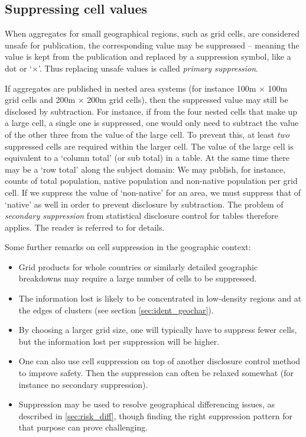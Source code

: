 \subsection{Suppressing cell values} \label{sec:aux_suppr}

When aggregates for small geographical regions, such as grid cells, are considered unsafe for publication, the corresponding value may be suppressed -- meaning the value is kept from the publication and replaced by a suppression symbol, like a dot or `$\times$'. Thus replacing unsafe values is called \emph{primary suppression}. 

If aggregates are published in nested area systems (for instance 100m $\times$ 100m grid cells and 200m $\times$ 200m grid cells), then the suppressed value may still be disclosed by subtraction. For instance, if from the four nested cells that make up a large cell, a single one is suppressed, one would only need to subtract the value of the other three from the value of the large cell. To prevent this, at least \emph{two} suppressed cells are required within the larger cell. The value of the large cell is equivalent to a `column total' (or sub total) in a table. At the same time there may be a `row total' along the subject domain: We may publish, for instance, counts of total population, native population and non-native population per grid cell. If we suppress the value of `non-native' for an area, we must suppress that of `native' as well in order to prevent disclosure by subtraction. The problem of \emph{secondary suppression} from statistical disclosure control for tables therefore applies. The reader is referred to \citet[ch. 4]{HundepoolEtAl2024} for details.

Some further remarks on cell suppression in the geographic context:
\begin{itemize}
    \item Grid products for whole countries or similarly detailed geographic breakdowns may require a large number of cells to be suppressed. 
    \item The information lost is likely to be concentrated in low-density regions and at the edges of clusters (see section \ref{sec:ident_geochar}).
    \item By choosing a larger grid size, one will typically have to suppress fewer cells, but the information lost per suppression will be higher.
    \item One can also use cell suppression on top of another disclosure control method to improve safety. Then the suppression can often be relaxed somewhat (for instance no secondary suppression).
    \item Suppression may be used to resolve geographical differencing issues, as described in \ref{sec:risk_diff}, though finding the right suppression pattern for that purpose can prove challenging.
\end{itemize}

\newpage